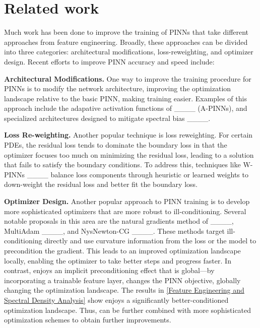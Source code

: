 \section{Related work}
Much work has been done to improve the training of PINNs that take different approaches from feature engineering. 
Broadly, 
these approaches can be divided into three categories: architectural modifications, loss-reweighting, and optimizer design.  
Recent efforts to improve PINN accuracy and speed include:

\textbf{Architectural Modifications.}
One way to improve the training procedure for PINNs is to modify the network architecture, improving the optimization landscape  relative to the basic PINN, making training easier. 
Examples of this approach include the adapative activation functions of ____ (A-PINNs), and specialized architectures designed to mitigate spectral bias ____.
    
\textbf{Loss Re-weighting.}
Another popular technique is loss reweighting.
For certain PDEs, the residual loss tends to dominate the boundary loss in that the optimizer focuses too much on minimizing the residual loss, leading to a solution that fails to satisfy the boundary conditions. 
To address this, techniques like W-PINNs ____ balance loss components through heuristic or learned weights to down-weight the
residual loss and better fit the boundary loss.

\textbf{Optimizer Design.}
Another popular approach to PINN training is to develop more sophisticated optimizers that are more robust to ill-conditioning. 
Several notable proposals in this area are the natural gradients method of ____, MultiAdam ____, and NysNewton-CG ____.
These methods target ill-conditioning directly and use curvature information from the loss or the model to precondition the gradient.
This leads to an improved optimization landscape locally, enabling the optimizer to take better steps and progress faster.
In contrast, \sfnet{} enjoys an implicit preconditioning effect that is global---by incorporating a trainable feature layer, \sfnet{} changes the PINN objective, globally changing the optimization landscape.
The results in \cref{Feature Engineering and Spectral Density Analysis} show \sfnet{} enjoys a significantly better-conditioned optimization landscape. 
Thus, \sfnet{} can be further combined with more sophisticated optimization schemes to obtain further improvements.